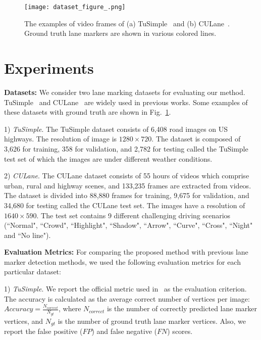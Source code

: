 \documentclass[10pt,twocolumn,letterpaper]{article}
\begin{document}
\def\algorithmname{E2E-LMD}
\def\reductionname{HRM}
\def\reductionnames{HRMs}
\newcommand{\tablestyle}[2]{\setlength{\tabcolsep}{#1}\renewcommand{\arraystretch}{#2}\centering\footnotesize}

\begin{figure}[t]
	\centering
	\texttt{[image: dataset\_figure\_.png]}
	\caption{The examples of video frames of (a) TuSimple~\cite{tusimple} and (b) CULane~\cite{SpatialAsDeep}. Ground truth lane markers are shown in various colored lines.}
	\label{fig:dataset}
\end{figure}

\section{Experiments}

\textbf{Datasets:}  We consider two lane marking datasets for evaluating our method. TuSimple~\cite{tusimple} and CULane~\cite{SpatialAsDeep} are widely used in previous works. Some examples of these datasets with ground truth are shown in Fig.~\ref{fig:dataset}.

1) \textit{TuSimple}. The TuSimple dataset consists of 6,408 road images on US highways. The resolution of image is $1280 \times 720$. The dataset is composed of 3,626 for training, 358 for validation, and 2,782 for testing called the TuSimple test set of which the images are under different weather conditions. 

2) \textit{CULane}. The CULane dataset consists of 55 hours of videos which comprise urban, rural and highway scenes, and 133,235 frames are extracted from videos. The dataset is divided into 88,880 frames for training, 9,675 for validation, and 34,680 for testing called the CULane test set. The images have a resolution of $1640 \times 590$. The test set contains 9 different challenging driving scenarios (``Normal", ``Crowd", ``Highlight", ``Shadow", ``Arrow", ``Curve", ``Cross", ``Night" and ``No line").


\textbf{Evaluation Metrics:} For comparing the proposed method with previous lane marker detection methods, we used the following evaluation metrics for each particular dataset:

1) \textit{TuSimple}. We report the official metric used in~\cite{tusimple} as the evaluation criterion. The accuracy is calculated as the average correct number of vertices per image: $Accuracy = \frac{N_{correct}}{N_{gt}}$, where $N_{correct}$ is the number of correctly predicted lane marker vertices, and $N_{gt}$ is the number of ground truth lane marker vertices. Also, we report the false positive ($FP$) and false negative ($FN$) scores.
\end{document}
